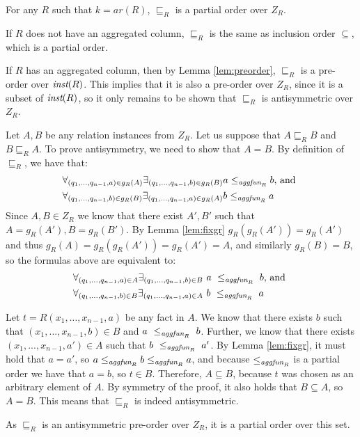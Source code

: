 \begin{thm}
For any $R$ such that $k=ar(R)$, $\sqsubseteq_R$ is a partial order over $Z_R$.
\end{thm}
\begin{prof}
If $R$ does not have an aggregated column, $\sqsubseteq_R$ is the same as inclusion order $\subseteq$, which is a partial order.

If $R$ has an aggregated column, then by Lemma \ref{lem:preorder}, $\sqsubseteq_R$ is a pre-order over $\textit{inst}(R)$. This implies that it is also a pre-order over $Z_R$, since it is a subset of $\textit{inst}(R)$, so it only remains to be shown that $\sqsubseteq_R$ is antisymmetric over $Z_R$.

Let $A, B$ be any relation instances from $Z_R$. Let us suppose that $A \sqsubseteq_R B$ and $B \sqsubseteq_R A$. To prove antisymmetry, we need to show that $A = B$. By definition of $\sqsubseteq_R$, we have that:
\begin{align*}
\forall_{(q_1, ..., q_{n-1}, a) \in g_R(A)} \exists_{(q_1, ..., q_{n-1}, b) \in g_R(B)} a \le_{\textit{aggfun}_R} b & \text{, and } \\
\forall_{(q_1, ..., q_{n-1}, b) \in g_R(B)} \exists_{(q_1, ..., q_{n-1}, a) \in g_R(A)} b \le_{\textit{aggfun}_R} a &
\end{align*}
Since $A, B \in Z_R$ we know that there exist $A', B'$ such that $A = g_R(A'), B = g_R(B')$. By Lemma \ref{lem:fixgr} $g_R(g_R(A')) = g_R(A')$ and thus $g_R(A) = g_R(g_R(A')) = g_R(A') = A$, and similarly $g_R(B) = B$, so the formulas above are equivalent to:
\begin{align*}
\forall_{(q_1, ..., q_{n-1}, a) \in A} \exists_{(q_1, ..., q_{n-1}, b) \in B}~a~\le_{\textit{aggfun}_R}~b &\text{, and }  \\
\forall_{(q_1, ..., q_{n-1}, b) \in B} \exists_{(q_1, ..., q_{n-1}, a) \in A}~b~\le_{\textit{aggfun}_R}~a&
\end{align*}

Let $t = R(x_1, \dots, x_{n-1}, a)$ be any fact in $A$. We know that there exists $b$ such that $(x_1, ..., x_{n-1}, b) \in B$ and $a~\le_{\textit{aggfun}_R}~b$. Further, we know that there exists $(x_1, ..., x_{n-1}, a') \in A$ such that $b~\le_{\textit{aggfun}_R}~a'$. By Lemma \ref{lem:fixgr}, it must hold that $a = a'$, so $a \le_{\textit{aggfun}_R} b \le_{\textit{aggfun}_R} a$, and because $\le_{\textit{aggfun}_R}$ is a partial order we have that $a = b$, so $t \in B$. Therefore, $A \subseteq B$, because $t$ was chosen as an arbitrary element of $A$. By symmetry of the proof, it also holds that $B \subseteq A$, so $A = B$. This means that $\sqsubseteq_R$ is indeed antisymmetric.

As $\sqsubseteq_R$ is an antisymmetric pre-order over $Z_R$, it is a partial order over this set.
\QEDA
\end{prof}


